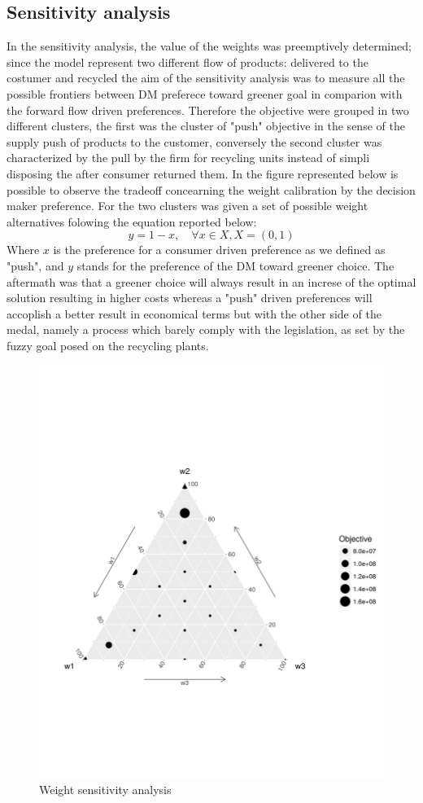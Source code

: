 \documentclass{article}
\begin{document}
\subsection{Sensitivity analysis}
In the sensitivity analysis, the value of the weights was preemptively determined; since the model represent two different flow of products: delivered to the costumer and recycled the aim of the sensitivity analysis was to measure all the possible frontiers between DM preferece toward greener goal in comparion with the forward flow driven preferences. Therefore the objective were grouped in two different clusters, the first was the cluster of "push" objective in the sense of the supply push of products to the customer, conversely the second cluster was characterized by the pull by the firm for recycling units instead of simpli disposing the after consumer returned them. In the figure represented below is possible to observe the tradeoff concearning the weight calibration by the decision maker preference.
For the two clusters was given a set of possible weight alternatives folowing the equation reported below:
$$
y=1-x, \quad \forall x \in X, X = (0,1)
$$
Where $x$ is the preference for a consumer driven preference as we defined as "push", and $y$ stands for the preference of the DM toward greener choice.
The aftermath was that a greener choice will always result in an increse of the optimal solution resulting in higher costs whereas a "push" driven preferences will accoplish a better result in economical terms but with the other side of the medal, namely a process which barely comply with the legislation, as set by the fuzzy goal posed on the recycling plants.
\begin{figure}[h]
\centering
\includegraphics[width=0.7\linewidth]{Images/ternary.png}
\caption{Weight sensitivity analysis}
\end{figure}
\end{document}
